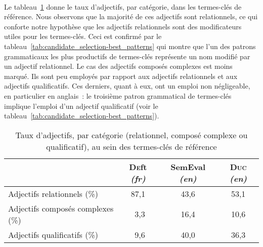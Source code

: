       ~\\Le tableau~\ref{tab:candidate_selection-adjective_categories} donne le
      taux d'adjectifs, par catégorie, dans les termes-clés de référence. Nous
      observons que la majorité de ces adjectifs sont relationnels, ce qui
      conforte notre hypothèse que les adjectifs relationnels sont des
      modificateurs utiles pour les termes-clés. Ceci est confirmé par le
      tableau~\ref{tab:candidate_selection-best_patterns} qui montre que l'un
      des patrons grammaticaux les plus productifs de termes-clés représente un
      nom modifié par un adjectif relationnel. Le cas des adjectifs composés
      complexes est moins marqué. Ils sont peu employés par rapport aux
      adjectifs relationnels et aux adjectifs qualificatifs. Ces derniers, quant
      à eux, ont un emploi non négligeable, en particulier en anglais~: le
      troisième patron grammatical de termes-clés implique l'emploi d'un
      adjectif qualificatif
      (voir le tableau~\ref{tab:candidate_selection-best_patterns}).
      \begin{table}[!ht]
        \centering
          \begin{tabular}{l|ccc}
            \toprule
             & \textbf{\textsc{De}ft} \textit{(fr)} & \textbf{SemEval} \textit{(en)} & \textbf{\textsc{Duc}} \textit{(en)}\\
            \hline
            Adjectifs relationnels \hfill(\%) & 87,1 & 43,6 & 53,1\\
            Adjectifs composés complexes \hfill(\%) & $~~$3,3 & 16,4 & 10,6\\
            Adjectifs qualificatifs \hfill(\%) & $~~$9,6 & 40,0 & 36,3\\
            \bottomrule
        \end{tabular}
        \caption{Taux d'adjectifs, par catégorie (relationnel, composé complexe
                 ou qualificatif), au sein des termes-clés de référence}
                 \label{tab:candidate_selection-adjective_categories}
      \end{table}

